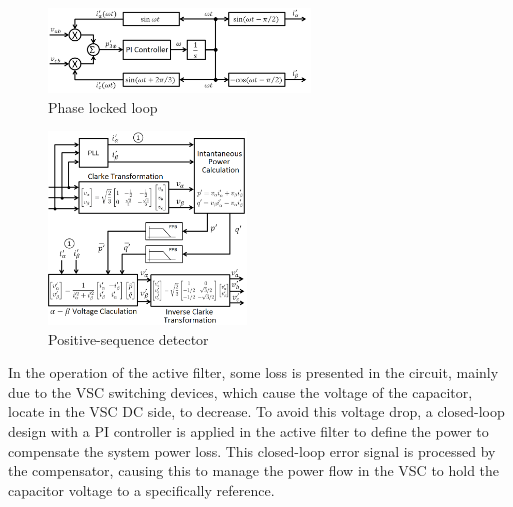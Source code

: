 \begin{figure}[!b]
	\centering
	\includegraphics[width=0.62\textwidth]{Figures/PLL.png}
	\caption{Phase locked loop}
	\label{fig:PLL.png}
\end{figure}

\begin{figure}[!b]
	\centering
	\includegraphics[width=0.47\textwidth]{Figures/detector_seq_positiva.png}
	\caption{Positive-sequence detector}
	\label{fig:detector_seq_positiva.png}
\end{figure}

In the operation of the active filter, some loss is presented in the circuit, mainly due to the VSC switching devices, which cause the voltage of the capacitor, locate in the VSC DC side, to decrease. To avoid this voltage drop, a closed-loop design with a PI controller is applied in the active filter to define the power to compensate the system power loss. This closed-loop error signal is processed by the compensator, causing this to manage the power flow in the VSC to hold the capacitor voltage to a specifically reference.